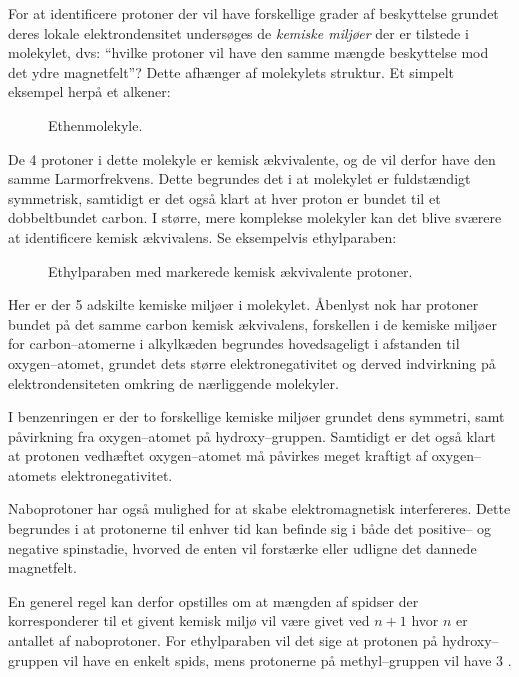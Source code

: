     For at identificere protoner der vil have forskellige grader af beskyttelse grundet deres lokale elektrondensitet undersøges de \textit{kemiske miljøer} der er tilstede i molekylet, dvs: ``hvilke protoner vil have den samme mængde beskyttelse mod det ydre magnetfelt''? Dette afhænger af molekylets struktur. Et simpelt eksempel herpå et alkener:
    \begin{figure}[H]\centering
        \caption{Ethenmolekyle.}
    \end{figure}
    De 4 protoner i dette molekyle er kemisk ækvivalente, og de vil derfor have den samme Larmorfrekvens. Dette begrundes det i at molekylet er fuldstændigt symmetrisk, samtidigt er det også klart at hver proton er bundet til et dobbeltbundet carbon. I større, mere komplekse molekyler kan det blive sværere at identificere kemisk ækvivalens. Se eksempelvis ethylparaben:
    \begin{figure}[H]\centering
        \caption{Ethylparaben med markerede kemisk ækvivalente protoner.}
    \end{figure}
    Her er der 5 adskilte kemiske miljøer i molekylet. Åbenlyst nok har protoner bundet på det samme carbon kemisk ækvivalens, forskellen i de kemiske miljøer for carbon--atomerne i alkylkæden begrundes hovedsageligt i afstanden til oxygen--atomet, grundet dets større elektronegativitet og derved indvirkning på elektrondensiteten omkring de nærliggende molekyler. 

    I benzenringen er der to forskellige kemiske miljøer grundet dens symmetri, samt påvirkning fra oxygen--atomet på hydroxy--gruppen. Samtidigt er det også klart at protonen vedhæftet oxygen--atomet må påvirkes meget kraftigt af oxygen--atomets elektronegativitet.

    Naboprotoner har også mulighed for at skabe elektromagnetisk interfereres. Dette begrundes i at protonerne til enhver tid kan befinde sig i både det positive-- og negative spinstadie, hvorved de enten vil forstærke eller udligne det dannede magnetfelt.

    En generel regel kan derfor opstilles om at mængden af spidser der korresponderer til et givent kemisk miljø vil være givet ved $n+1$ hvor  $n$ er antallet af naboprotoner. For ethylparaben vil det sige at protonen på hydroxy--gruppen vil have en enkelt spids, mens protonerne på methyl--gruppen vil have 3 \parencite{Nana2020}.

